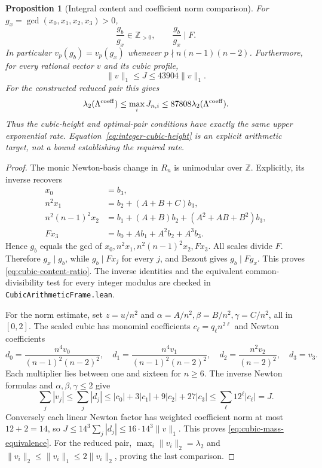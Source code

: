 \documentclass[11pt]{article}
\newtheorem{proposition}[theorem]{Proposition}
\theoremstyle{remark}
\newcommand{\Z}{\mathbb Z}
\begin{document}
\begin{proposition}[Integral content and coefficient norm comparison]
\label{prop:cubic-content}
For \(g_x=\gcd(x_0,x_1,x_2,x_3)>0\),
\begin{equation}
 \frac{g_b}{g_x}\in\Z_{>0},\qquad \frac{g_b}{g_x}\mid F.
 \label{eq:cubic-content-ratio}
\end{equation}
In particular \(v_p(g_b)=v_p(g_x)\) whenever
\(p\nmid n(n-1)(n-2)\). Furthermore, for every rational vector \(v\)
and its cubic profile,
\begin{equation}
 \|v\|_1\le J\le43904\|v\|_1.
 \label{eq:cubic-mass-equivalence}
\end{equation}
For the constructed reduced pair this gives
\[
 \lambda_2(\Lambda^{\rm coeff})\le\max_iJ_{n,i}
       \le87808\lambda_2(\Lambda^{\rm coeff}).
\]
Thus the cubic-height and optimal-pair conditions have exactly the same
upper exponential rate. Equation~\eqref{eq:integer-cubic-height} is an
explicit arithmetic target, not a bound establishing the required rate.
\end{proposition}
\begin{proof}
The monic Newton-basis change in \(R_n\) is unimodular over \(\Z\).
Explicitly, its inverse recovers
\begin{align*}
 x_0&=b_3,\\
 n^2x_1&=b_2+(A+B+C)b_3,\\
 n^2(n-1)^2x_2&=b_1+(A+B)b_2+(A^2+AB+B^2)b_3,\\
 Fx_3&=b_0+Ab_1+A^2b_2+A^3b_3.
\end{align*}
Hence \(g_b\) equals the gcd of
\(x_0,n^2x_1,n^2(n-1)^2x_2,Fx_3\).
All scales divide \(F\). Therefore \(g_x\mid g_b\), while
\(g_b\mid Fx_j\) for every \(j\), and Bezout gives
\(g_b\mid Fg_x\). This proves \eqref{eq:cubic-content-ratio}.
The inverse identities and the equivalent common-divisibility test
for every integer modulus are checked in \texttt{CubicArithmeticFrame.lean}.

For the norm estimate, set \(z=u/n^2\) and
\(\alpha=A/n^2,\beta=B/n^2,\gamma=C/n^2\), all in \([0,2]\).
The scaled cubic has monomial coefficients \(c_\ell=q_\ell n^{2\ell}\)
and Newton coefficients
\[
 d_0=\frac{n^4v_0}{(n-1)^2(n-2)^2},\quad
 d_1=\frac{n^4v_1}{(n-1)^2(n-2)^2},\quad
 d_2=\frac{n^2v_2}{(n-2)^2},\quad d_3=v_3.
\]
Each multiplier lies between one and sixteen for \(n\ge6\).
The inverse Newton formulas and \(\alpha,\beta,\gamma\le2\) give
\[
 \sum_j|v_j|\le\sum_j|d_j|
 \le|c_0|+3|c_1|+9|c_2|+27|c_3|
 \le\sum_\ell12^\ell|c_\ell|=J.
\]
Conversely each linear Newton factor has weighted coefficient norm
at most \(12+2=14\), so
\(J\le14^3\sum_j|d_j|\le16\cdot14^3\|v\|_1\).
This proves \eqref{eq:cubic-mass-equivalence}. For the reduced pair,
\(\max_i\|v_i\|_2=\lambda_2\) and
\(\|v_i\|_2\le\|v_i\|_1\le2\|v_i\|_2\), proving the last comparison.
\end{proof}
\end{document}
